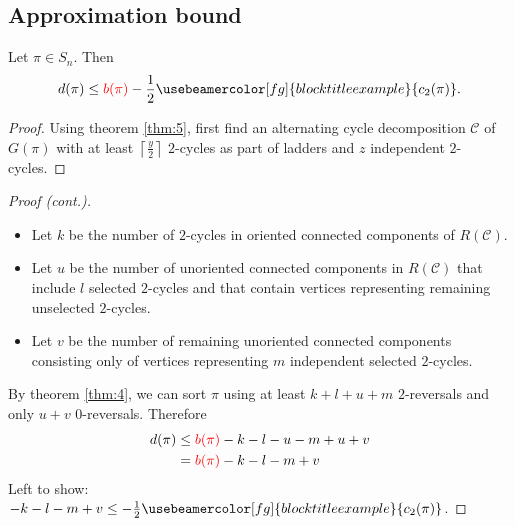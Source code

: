 \documentclass[handout]{beamer}
\theoremstyle{definition}
\def\r{\textcolor{red}}
\def\g#1{{\usebeamercolor[fg]{block title example}{#1}}}
\begin{document}
\subsection{Approximation bound}

\begin{frame}

\begin{theorem}
\label{thm:6}
Let $\pi \in S_n$. Then
\begin{align*}
    d(\pi) \leq \r{b(\pi)} - \frac{1}{2} \g{c_2(\pi)}.
\end{align*}
\end{theorem}\pause

\begin{proof}\renewcommand{\qedsymbol}{}
Using theorem \ref{thm:5}, first find an alternating cycle decomposition $\mathcal{C}$ of $G(\pi)$ with at least $\left\lceil \frac{y}{2} \right\rceil$ $2$-cycles as part of ladders and $z$ independent $2$-cycles.
\end{proof}

\end{frame}

\begin{frame}

\begin{proof}[Proof (cont.)]\renewcommand{\qedsymbol}{}
\begin{itemize}
    \item Let $k$ be the number of $2$-cycles in oriented connected components of $R(\mathcal{C})$.\pause
    \item Let $u$ be the number of unoriented connected components in $R(\mathcal{C})$ that include $l$ selected $2$-cycles and that contain vertices representing remaining unselected $2$-cycles.\pause
    \item Let $v$ be the number of remaining unoriented connected components consisting only of vertices representing $m$ independent selected $2$-cycles.
\end{itemize}\pause
By theorem \ref{thm:4}, we can sort $\pi$ using at least $k+l+u+m$ $2$-reversals and only $u+v$ $0$-reversals. \pause Therefore
\begin{align*}
    d(\pi) &\leq \r{b(\pi)} - k - l - u - m + u + v \\
           &= \r{b(\pi)} - k - l - m + v
\end{align*}\pause
Left to show: $-k-l-m+v \leq - \frac{1}{2} \g{c_2(\pi)}$.
\end{proof}

\end{frame}
\end{document}

